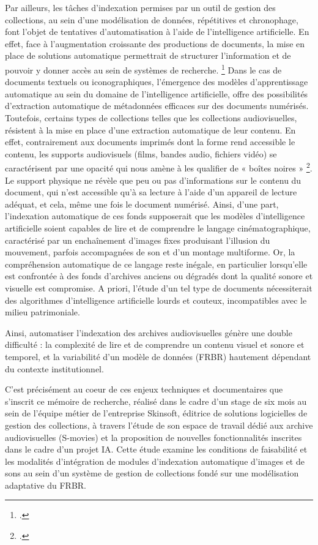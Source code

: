 Par ailleurs, les tâches d'indexation permises par un outil de gestion des collections, au sein d'une modélisation de données, répétitives et chronophage, font l'objet de tentatives  d'automatisation à l'aide de l'intelligence artificielle. En effet, face à l'augmentation croissante des productions de documents, la mise en place de solutions automatique permettrait de structurer l'information et de pouvoir y donner accès au sein de systèmes de recherche. \footcite{barreaux2017} Dans le cas de documents textuels ou iconographiques, l'émergence des modèles d'apprentissage automatique au sein du domaine de l'intelligence artificielle, offre des possibilités d'extraction automatique de métadonnées efficaces sur des documents numérisés. Toutefois, certains types de collections telles que les collections audiovisuelles, résistent à la mise en place d'une extraction automatique de leur contenu. En effet, contrairement aux documents imprimés dont la forme rend accessible le contenu, les supports audiovisuels (films, bandes audio, fichiers vidéo) se caractérisent par une opacité qui nous amène à les qualifier de « boîtes noires » \footcite{zotero-item-582}. Le support physique ne révèle que peu ou pas d'informations sur le contenu du document, qui n'est accessible qu'à sa lecture à l'aide d'un appareil de lecture adéquat, et cela, même une fois le document numérisé. 
Ainsi, d'une part, l'indexation automatique de ces fonds supposerait que les modèles d'intelligence artificielle soient capables de lire et de comprendre le langage cinématographique, caractérisé par un enchaînement d'images fixes produisant l'illusion du mouvement, parfois accompagnées de son et d'un montage multiforme. Or, la compréhension automatique de ce langage reste inégale, en particulier lorsqu'elle est confrontée à des fonds d'archives anciens ou dégradés dont la qualité sonore et visuelle est compromise. A priori, l'étude d'un tel type de documents nécessiterait des algorithmes d'intelligence artificielle lourds et couteux, incompatibles avec le milieu patrimoniale. 

Ainsi, automatiser l'indexation des archives audiovisuelles génère une double difficulté : la complexité de lire et de comprendre un contenu visuel et sonore et temporel, et la variabilité d'un modèle de données (FRBR) hautement dépendant du contexte institutionnel.

C'est précisément au coeur de ces enjeux techniques et documentaires que s'inscrit ce mémoire de recherche, réalisé dans le cadre d'un stage de six mois au sein de l'équipe métier de l'entreprise Skinsoft, éditrice de solutions logicielles de gestion des collections, à travers l'étude de son espace de travail dédié aux archive audiovisuelles (S-movies) et la proposition de nouvelles fonctionnalités inscrites dans le cadre d'un projet IA. Cette étude examine les conditions de faisabilité et les modalités d'intégration de modules d'indexation automatique d'images et de sons au sein d'un système de gestion de collections fondé sur une modélisation adaptative du FRBR.

